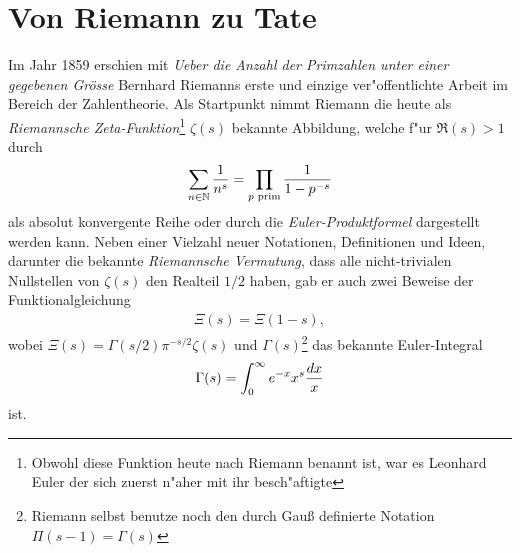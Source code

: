 
\section{Von Riemann zu Tate}
	Im Jahr 1859 erschien mit \emph{\glqq Ueber die Anzahl der Primzahlen unter einer gegebenen Grösse\grqq} Bernhard Riemanns erste und einzige ver"offentlichte Arbeit im Bereich der Zahlentheorie.
	Als Startpunkt nimmt Riemann die heute als \emph{Riemannsche Zeta-Funktion}\footnote{Obwohl diese Funktion heute nach Riemann benannt ist, war es Leonhard Euler der sich zuerst n"aher mit ihr besch"aftigte } $\zeta(s)$ bekannte Abbildung, welche f"ur $\Re(s)>1$ durch
	\begin{align*}
		\sum_{n\in \mathbb{N}} \frac{1}{n^s} = \prod_{p \text{ prim}} \frac{1}{1-p^{-s}}
	\end{align*}
	als absolut konvergente Reihe oder durch die \emph{Euler-Produktformel} dargestellt werden kann.
	Neben einer Vielzahl neuer Notationen, Definitionen und Ideen, darunter die bekannte \emph{Riemannsche Vermutung}, dass alle nicht-trivialen Nullstellen von $\zeta(s)$ den Realteil $1/2$ haben, gab er auch zwei Beweise der Funktionalgleichung
	\begin{align*}
		\Xi(s) = \Xi(1-s),
	\end{align*}
	wobei $\Xi(s) = \Gamma(s/2)\pi^{-s/2}\zeta(s)$ und $\Gamma(s)$\footnote{Riemann selbst benutze noch den durch Gauß definierte Notation $\Pi(s-1)=\Gamma(s)$} das bekannte Euler-Integral
	\begin{align*}
		\Gamma(s) = \int_0^\infty e^{-x} x^s \frac{d{x}}{x}
	\end{align*}
	ist.
	
